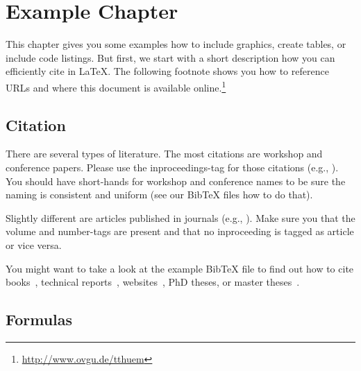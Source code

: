 \chapter{Example Chapter}
\label{example}

This chapter gives you some examples how to include graphics, create tables, or include code listings. But first, we start with a short description how you can efficiently cite in \LaTeX. The following footnote shows you how to reference URLs and where this document is available online.\footnote{\url{http://www.ovgu.de/tthuem}}

%
%

\section{Citation}

There are several types of literature. The most citations are workshop and conference papers. Please use the inproceedings-tag for those citations (e.g., \cite{KAK:GPCE09}). You should have short-hands for workshop and conference names to be sure the naming is consistent and uniform (see our BibTeX files how to do that).

Slightly different are articles published in journals (e.g., \cite{KG:SME06}). Make sure you that the volume and number-tags are present and that no inproceeding is tagged as article or vice versa.

You might want to take a look at the example BibTeX file to find out how to cite books~\cite{CE:BOOK00}, technical reports~\cite{KCHNP:TR90}, websites~\cite{Coq:website}, PhD theses, or master theses~\cite{B:PHD03,R:MT09}.

\section{Formulas}

